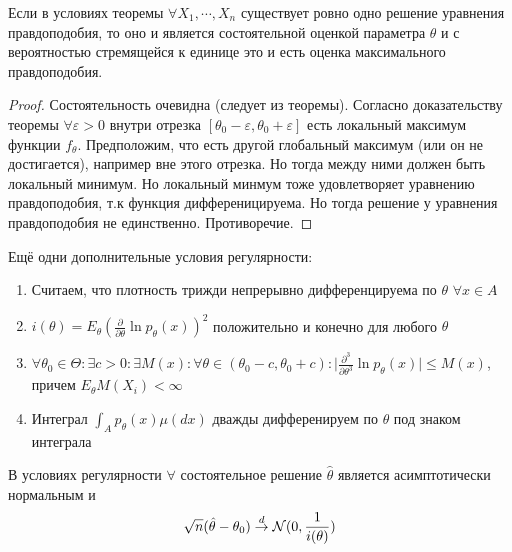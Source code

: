 \documentclass[document.tex]{subfiles}
\begin{document}
\begin{corollary}
    Если в условиях теоремы $\forall X_1, \cdots, X_n$ существует ровно одно решение уравнения правдоподобия, то оно и
    является состоятельной оценкой параметра $\theta$ и с вероятностью стремящейся к единице это и есть оценка
    максимального правдоподобия.
\end{corollary}

\begin{proof}
    Состоятельность очевидна (следует из теоремы). Согласно доказательству теоремы $\forall \varepsilon > 0$ внутри
    отрезка $[\theta_0 - \varepsilon, \theta_0 + \varepsilon]$ есть локальный максимум функции $f_{\theta}$.
    Предположим, что есть другой глобальный максимум (или он не достигается), например вне этого отрезка. Но тогда между
    ними должен быть локальный минимум. Но локальный минмум тоже удовлетворяет уравнению правдоподобия, т.к функция
    дифференицируема. Но тогда решение у уравнения правдоподобия не единственно. Противоречие.
\end{proof}

\begin{definition}
    Ещё одни дополнительные условия регулярности:
    \begin{enumerate}
        \item Считаем, что плотность трижди непрерывно дифференцируема по $\theta$ $\forall x \in A$
        \item $i(\theta) = E_{\theta}(\frac{\partial}{\partial \theta}\ln p_{\theta}(x))^2$ положительно и конечно для
            любого $\theta$
        \item $\forall \theta_0 \in \Theta: \exists c > 0: \exists M(x) : \forall \theta \in (\theta_0 - c, \theta_0 +
            c): \lvert \frac{\partial^3}{\partial \theta^3} \ln p_{\theta}(x) \rvert \leq M(x)$, причем
            $E_{\theta}M(X_i) < \infty$
        \item Интеграл $\int_{A}^{} p_{\theta}(x) \mu(dx)$ дважды дифференируем по $\theta$ под знаком интеграла
    \end{enumerate}
\end{definition}

\begin{theorem}
    В условиях регулярности $\forall$ состоятельное решение $\hat \theta$ является асимптотически нормальным и
    \[
        \sqrt{n}(\hat \theta - \theta_0) \stackrel{d}{\rightarrow} \mathcal{N}(0, \frac{1}{i(\theta)})
    \]
\end{theorem}
\end{document}

